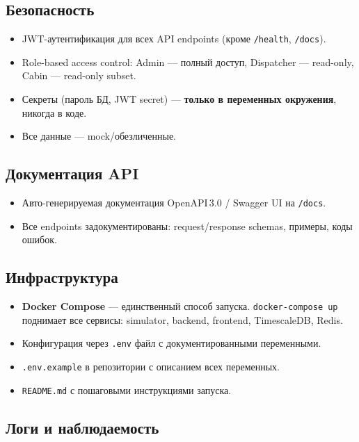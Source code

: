 \documentclass[12pt,a4paper]{article}
\newcommand{\code}[1]{\texttt{#1}}
\begin{document}
\subsection{Безопасность}

\begin{itemize}[nosep]
  \item JWT-аутентификация для всех API endpoints (кроме \code{/health}, \code{/docs}).
  \item Role-based access control: Admin --- полный доступ, Dispatcher --- read-only, Cabin --- read-only subset.
  \item Секреты (пароль БД, JWT secret) --- \textbf{только в переменных окружения}, никогда в коде.
  \item Все данные --- mock/обезличенные.
\end{itemize}

\subsection{Документация API}

\begin{itemize}[nosep]
  \item Авто-генерируемая документация OpenAPI\,3.0 / Swagger UI на \code{/docs}.
  \item Все endpoints задокументированы: request/response schemas, примеры, коды ошибок.
\end{itemize}

\subsection{Инфраструктура}

\begin{itemize}[nosep]
  \item \textbf{Docker Compose} --- единственный способ запуска. \code{docker-compose up} поднимает все сервисы: simulator, backend, frontend, TimescaleDB, Redis.
  \item Конфигурация через \code{.env} файл с документированными переменными.
  \item \code{.env.example} в репозитории с описанием всех переменных.
  \item \code{README.md} с пошаговыми инструкциями запуска.
\end{itemize}

\subsection{Логи и наблюдаемость}
\end{document}
